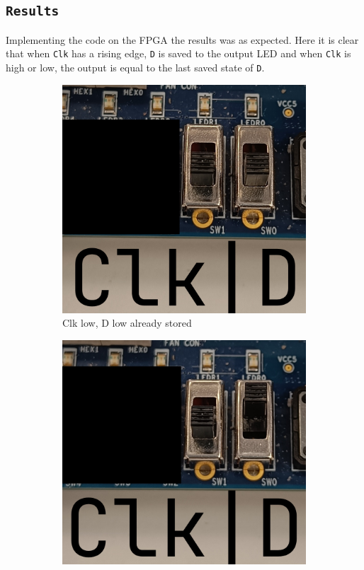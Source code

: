\documentclass{article}
\let\oldsubsection\subsection
\renewcommand{\subsection}[1]{%
  \oldsubsection{\texttt{#1}}%
  \setcounter{subsubsection}{-1}%
}
\begin{document}
\subsection{Results}
Implementing the code on the FPGA the results was as expected. Here it is clear that when \verb|Clk| has a rising edge, \verb|D| is saved to the output LED and when \verb|Clk| is high or low, the output is equal to the last saved state of \verb|D|.
\clearpage
\begin{figure}[h]
    \centering
    \begin{subfigure}[t]{0.45\textwidth}
        \centering
        \includegraphics[width=1\textwidth]{Figures/Part3_1.jpg}
        \caption{Clk low, D low already stored}
        \label{fig:p3_1}
    \end{subfigure}
    \hfill
    \begin{subfigure}[t]{0.45\textwidth}
        \centering
        \includegraphics[width=1\textwidth]{Figures/Part3_2.jpg}

\end{subfigure}
\end{figure}
\end{document}
